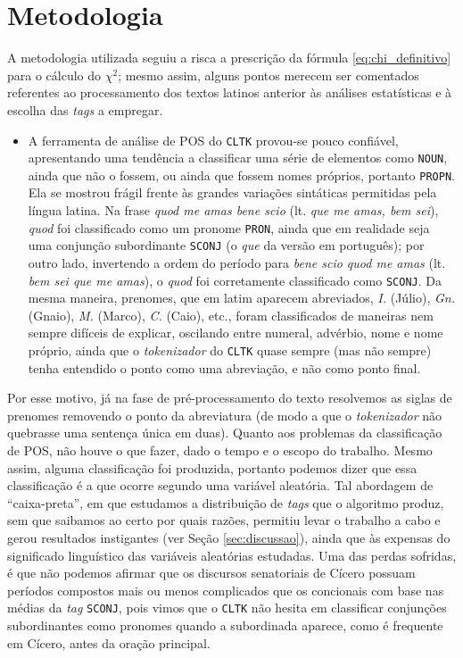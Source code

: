 \documentclass[10pt,a4paper,onecolumn]{article}
\theoremstyle{definition}
\theoremstyle{remark}
\begin{document}
\section{Metodologia}\label{sec:metodologia}
A metodologia utilizada seguiu a risca a prescrição da fórmula \eqref{eq:chi_definitivo} para o cálculo do $\chi^2$; mesmo assim, alguns pontos merecem ser comentados referentes ao processamento dos textos latinos anterior às análises estatísticas e à escolha das \emph{tags} a empregar.

\begin{itemize}
	\item A ferramenta de análise de POS do \texttt{CLTK} provou-se pouco confiável, apresentando uma tendência a classificar uma série de elementos como \texttt{NOUN}, ainda que não o fossem, ou ainda que fossem nomes próprios, portanto \texttt{PROPN}. Ela se mostrou frágil frente às grandes variações sintáticas permitidas pela língua latina. Na frase \emph{quod me amas bene scio} (lt. \emph{que me amas, bem sei}), \emph{quod} foi classificado como um pronome \texttt{PRON}, ainda que em realidade seja uma conjunção subordinante \texttt{SCONJ} (o \emph{que} da versão em português); por outro lado, invertendo a ordem do período para \emph{bene scio quod me amas} (lt. \emph{bem sei que me amas}), o \emph{quod} foi corretamente classificado como \texttt{SCONJ}. Da mesma maneira, prenomes, que em latim aparecem abreviados, \emph{I.} (Júlio), \emph{Gn.} (Gnaio), \emph{M.} (Marco), \emph{C.} (Caio), etc., foram classificados de maneiras nem sempre difíceis de explicar, oscilando entre numeral, advérbio, nome e nome próprio, ainda que o \emph{tokenizador} do \texttt{CLTK} quase sempre (mas não sempre) tenha entendido o ponto como uma abreviação, e não como ponto final.   
\end{itemize}

Por esse motivo, já na fase de pré-processamento do texto resolvemos as siglas de prenomes removendo o ponto da abreviatura (de modo a que o \emph{tokenizador} não quebrasse uma sentença única em duas). Quanto aos problemas da classificação de POS, não houve o que fazer, dado o tempo e o escopo do trabalho. Mesmo assim, alguma classificação foi produzida, portanto podemos dizer que essa classificação é a que ocorre segundo uma variável aleatória. Tal abordagem de ``caixa-preta'', em que estudamos a distribuição de \emph{tags} que o algoritmo produz, sem que saibamos ao certo por quais razões, permitiu levar o trabalho a cabo e gerou resultados instigantes (ver Seção \ref{sec:discussao}), ainda que às expensas do significado linguístico das variáveis aleatórias estudadas. Uma das perdas sofridas, é que não podemos afirmar que os discursos senatoriais de Cícero possuam períodos compostos mais ou menos complicados que os concionais com base nas médias da \emph{tag} \texttt{SCONJ}, pois vimos que o \texttt{CLTK} não hesita em classificar conjunções subordinantes como pronomes quando a subordinada aparece, como é frequente em Cícero, antes da oração principal.
\end{document}
